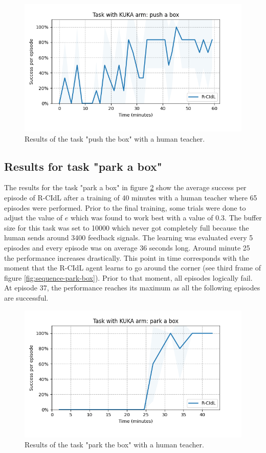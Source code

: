 





\begin{figure}[H]
    \centering
    \includegraphics[width=.7\textwidth]{figures/push_1.png}
    \caption{Results of the task "push the box" with a human teacher.}
    \label{fig:kukapush}
\end{figure}

\subsection{Results for task "park a box"}
\label{subsection:results_kuka_park}

The results for the task "park a box" in figure \ref{fig:kukapark} show the average success per episode of R-CIdL after a training of 40 minutes with a human teacher where 65 episodes were performed. Prior to the final training, some trials were done to adjust the value of $e$ which was found to work best with a value of 0.3. The buffer size for this task was set to 10000 which never got completely full because the human sends around 3400 feedback signals.
The learning was evaluated every 5 episodes and every episode was on average 36 seconds long. Around minute 25 the performance increases drastically. This point in time corresponds with the moment that the R-CIdL agent learns to go around the corner (see third frame of figure \ref{fig:sequence-park-box}). Prior to that moment, all episodes logically fail. At episode 37, the performance reaches its maximum as all the following episodes are successful.



\begin{figure}[H]
    \centering
    \includegraphics[width=.7\textwidth]{figures/park_1.png}
    \caption{Results of the task "park the box" with a human teacher.}
    \label{fig:kukapark}
\end{figure}